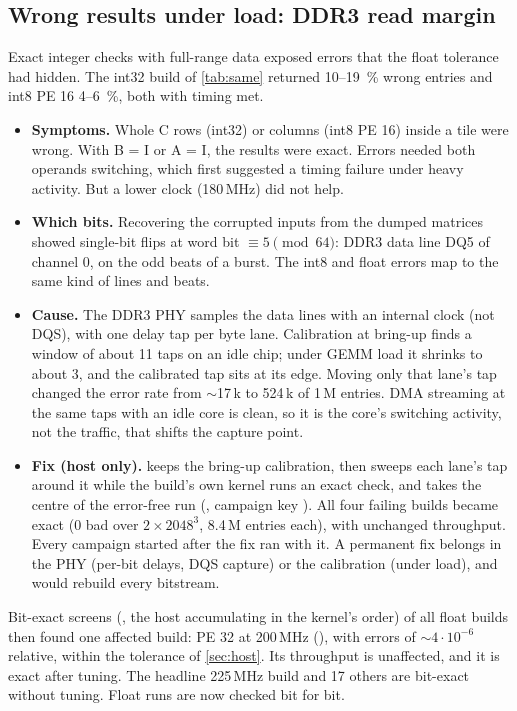 \subsection{Wrong results under load: DDR3 read margin}
\label{sec:formats:ddr}
Exact integer checks with full-range data exposed errors that the float tolerance had hidden. The int32 build of
\cref{tab:same} returned 10--\SI{19}{\percent} wrong entries and int8 PE 16 4--\SI{6}{\percent}, both with timing met.
\begin{itemize}
  \item \textbf{Symptoms.} Whole C rows (int32) or columns (int8 PE 16) inside a tile were wrong. With B = I or
        A = I, the results were exact. Errors needed both operands switching, which first suggested a timing failure
        under heavy activity. But a lower clock (180\,MHz) did not help.
  \item \textbf{Which bits.} Recovering the corrupted inputs from the dumped matrices showed single-bit flips at
        word bit \(\equiv 5 \pmod{64}\): DDR3 data line DQ5 of channel 0, on the odd beats of a burst. The int8 and
        float errors map to the same kind of lines and beats.
  \item \textbf{Cause.} The DDR3 PHY samples the data lines with an internal clock (not DQS), with one delay tap per
        byte lane. Calibration at bring-up finds a window of about 11 taps on an idle chip; under GEMM load it shrinks
        to about 3, and the calibrated tap sits at its edge. Moving only that lane's tap changed the error rate from
        \(\sim\)17\,k to 524\,k of 1\,M entries. DMA streaming at the same taps with an idle core is clean, so it is
        the core's switching activity, not the traffic, that shifts the capture point.
  \item \textbf{Fix (host only).}  keeps the bring-up calibration, then sweeps each lane's tap
        around it while the build's own kernel runs an exact check, and takes the centre of the error-free run
        (, campaign key ). All four failing builds became
        exact (0 bad over \(2 \times 2048^3\), 8.4\,M entries each), with unchanged throughput. Every campaign started
        after the fix ran with it. A permanent fix belongs in the PHY (per-bit delays, DQS capture) or the calibration (under load),
        and would rebuild every bitstream.
\end{itemize}
Bit-exact screens (, the host accumulating in the kernel's order) of all float builds then found
one affected build: PE 32 at 200\,MHz (), with errors of \(\sim\)\(4\cdot10^{-6}\) relative,
within the tolerance of \cref{sec:host}. Its throughput is unaffected, and it is exact after tuning. The headline
225\,MHz build and 17 others are bit-exact without tuning. Float runs are now checked bit for bit.

